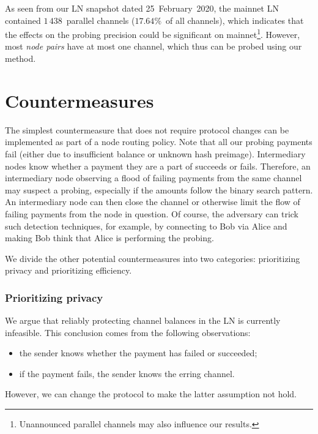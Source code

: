 As seen from our LN snapshot dated 25~February~2020, the mainnet LN contained $1\,438$~parallel channels ($17.64\%$~of all channels), which indicates that the effects on the probing precision could be significant on mainnet\footnote{Unannounced parallel channels may also influence our results.}.
However, most \textit{node pairs} have at most one channel, which thus can be probed using our method.


\section{Countermeasures}

The simplest countermeasure that does not require protocol changes can be implemented as part of a node routing policy.
Note that all our probing payments fail (either due to insufficient balance or unknown hash preimage).
Intermediary nodes know whether a payment they are a part of succeeds or fails.
Therefore, an intermediary node observing a flood of failing payments from the same channel may suspect a probing, especially if the amounts follow the binary search pattern.
An intermediary node can then close the channel or otherwise limit the flow of failing payments from the node in question.
Of course, the adversary can trick such detection techniques, for example, by connecting to Bob via Alice and making Bob think that Alice is performing the probing.

We divide the other potential countermeasures into two categories: prioritizing privacy and prioritizing efficiency.


\subsubsection*{Prioritizing privacy}

We argue that reliably protecting channel balances in the LN is currently infeasible.
This conclusion comes from the following observations:
\begin{itemize}
	\item the sender knows whether the payment has failed or succeeded;
	\item if the payment fails, the sender knows the erring channel.
\end{itemize}
However, we can change the protocol to make the latter assumption not hold.

